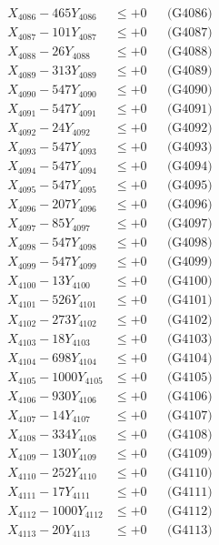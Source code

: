 \documentclass[a4paper,10pt]{article}
\begin{document}
{\begin{align}
X_{4086} - 465Y_{4086} &\leq +0 && \text{(G4086)} \\
X_{4087} - 101Y_{4087} &\leq +0 && \text{(G4087)} \\
X_{4088} - 26Y_{4088} &\leq +0 && \text{(G4088)} \\
X_{4089} - 313Y_{4089} &\leq +0 && \text{(G4089)} \\
X_{4090} - 547Y_{4090} &\leq +0 && \text{(G4090)} \\
\allowbreak
X_{4091} - 547Y_{4091} &\leq +0 && \text{(G4091)} \\
X_{4092} - 24Y_{4092} &\leq +0 && \text{(G4092)} \\
X_{4093} - 547Y_{4093} &\leq +0 && \text{(G4093)} \\
X_{4094} - 547Y_{4094} &\leq +0 && \text{(G4094)} \\
X_{4095} - 547Y_{4095} &\leq +0 && \text{(G4095)} \\
X_{4096} - 207Y_{4096} &\leq +0 && \text{(G4096)} \\
X_{4097} - 85Y_{4097} &\leq +0 && \text{(G4097)} \\
X_{4098} - 547Y_{4098} &\leq +0 && \text{(G4098)} \\
X_{4099} - 547Y_{4099} &\leq +0 && \text{(G4099)} \\
X_{4100} - 13Y_{4100} &\leq +0 && \text{(G4100)} \\
\allowbreak
X_{4101} - 526Y_{4101} &\leq +0 && \text{(G4101)} \\
X_{4102} - 273Y_{4102} &\leq +0 && \text{(G4102)} \\
X_{4103} - 18Y_{4103} &\leq +0 && \text{(G4103)} \\
X_{4104} - 698Y_{4104} &\leq +0 && \text{(G4104)} \\
X_{4105} - 1000Y_{4105} &\leq +0 && \text{(G4105)} \\
X_{4106} - 930Y_{4106} &\leq +0 && \text{(G4106)} \\
X_{4107} - 14Y_{4107} &\leq +0 && \text{(G4107)} \\
X_{4108} - 334Y_{4108} &\leq +0 && \text{(G4108)} \\
X_{4109} - 130Y_{4109} &\leq +0 && \text{(G4109)} \\
X_{4110} - 252Y_{4110} &\leq +0 && \text{(G4110)} \\
\allowbreak
X_{4111} - 17Y_{4111} &\leq +0 && \text{(G4111)} \\
X_{4112} - 1000Y_{4112} &\leq +0 && \text{(G4112)} \\
X_{4113} - 20Y_{4113} &\leq +0 && \text{(G4113)} \\

\end{align}}
\end{document}
